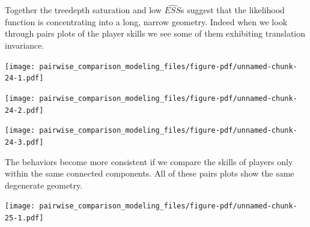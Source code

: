 \documentclass[
  letterpaper,
  DIV=11,
  numbers=noendperiod]{scrartcl}
\newenvironment{Shaded}{\begin{snugshade}}{\end{snugshade}}
\newcommand{\ControlFlowTok}[1]{\textcolor[rgb]{0.00,0.23,0.31}{#1}}
\newcommand{\DecValTok}[1]{\textcolor[rgb]{0.68,0.00,0.00}{#1}}
\newcommand{\FunctionTok}[1]{\textcolor[rgb]{0.28,0.35,0.67}{#1}}
\newcommand{\NormalTok}[1]{\textcolor[rgb]{0.00,0.23,0.31}{#1}}
\newcommand{\OtherTok}[1]{\textcolor[rgb]{0.00,0.23,0.31}{#1}}
\newcommand{\SpecialCharTok}[1]{\textcolor[rgb]{0.37,0.37,0.37}{#1}}
\newcommand{\StringTok}[1]{\textcolor[rgb]{0.13,0.47,0.30}{#1}}
\begin{document}
Together the treedepth saturation and low \(\hat{ESS}\)s suggest that
the likelihood function is concentrating into a long, narrow geometry.
Indeed when we look through pairs plots of the player skills we see some
of them exhibiting translation invariance.

\begin{Shaded}
\end{Shaded}

\texttt{[image: pairwise\_comparison\_modeling\_files/figure-pdf/unnamed-chunk-24-1.pdf]}

\texttt{[image: pairwise\_comparison\_modeling\_files/figure-pdf/unnamed-chunk-24-2.pdf]}

\texttt{[image: pairwise\_comparison\_modeling\_files/figure-pdf/unnamed-chunk-24-3.pdf]}

The behaviors become more consistent if we compare the skills of players
only within the same connected components. All of these pairs plots show
the same degenerate geometry.

\begin{Shaded}
\end{Shaded}

\texttt{[image: pairwise\_comparison\_modeling\_files/figure-pdf/unnamed-chunk-25-1.pdf]}

\begin{Shaded}
\end{Shaded}
\end{document}
